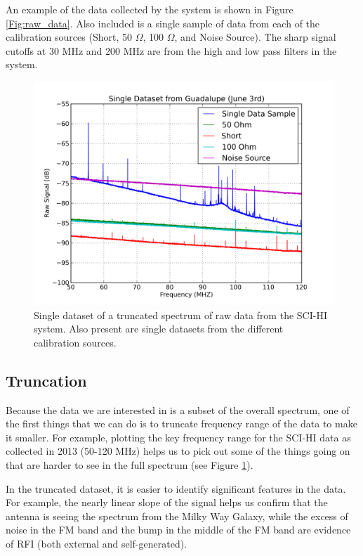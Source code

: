 An example of the data collected by the system is shown in Figure \ref{Fig:raw_data}. Also included is a single sample of data from each of the calibration sources (Short, 50 $\Omega$, 100 $\Omega$, and Noise Source). The sharp signal cutoffs at 30 MHz and 200 MHz are from the high and low pass filters in the system.

\begin{figure}[htb]
\begin{center}
\includegraphics[width=0.9\linewidth]{Data_analysis/figures/single_raw_trunc_guad_june03.png}
\caption{Single dataset of a truncated spectrum of raw data from the SCI-HI system. Also present are single datasets from the different calibration sources.}
\label{Fig:raw_data_trunc}
\end{center}
\end{figure}

\subsection{Truncation}
Because the data we are interested in is a subset of the overall spectrum, one of the first things that we can do is to truncate frequency range of the data to make it smaller. For example, plotting the key frequency range for the SCI-HI data as collected in 2013 (50-120 MHz) helps us to pick out some of the things going on that are harder to see in the full spectrum (see Figure \ref{Fig:raw_data_trunc}). 

In the truncated dataset, it is easier to identify significant features in the data. For example, the nearly linear slope of the signal helps us confirm that the antenna is seeing the spectrum from the Milky Way Galaxy, while the excess of noise in the FM band and the bump in the middle of the FM band are evidence of RFI (both external and self-generated). 

